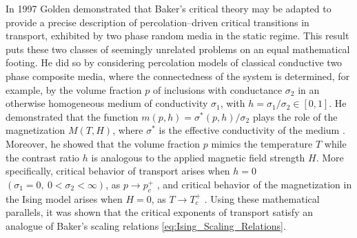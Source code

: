 \documentclass[english,12pt,jmp,graphicx]{revtex4-1}
\begin{document}
In 1997 Golden \cite{Golden:PRL-3935} demonstrated that Baker's
critical theory may be adapted to provide a precise description of
percolation--driven critical transitions in transport, exhibited by
two phase random media in the static regime. This result puts these
two classes of seemingly unrelated problems on an equal mathematical
footing. He did so by considering percolation models of classical
conductive two phase composite media, where the connectedness of the
system is determined, for example, by the volume fraction $p$ of
inclusions with conductance $\sigma_2$ in an otherwise homogeneous medium
of conductivity $\sigma_1$, with $h=\sigma_1/\sigma_2\in[0,1]$. 
He demonstrated that the function $m(p,h)=\sigma^*(p,h)/\sigma_2$ plays the role
of the magnetization  $M(T,H)$, where $\sigma^*$ is the effective
conductivity of the medium
\cite{Bergman:PRC-377,Milton:APL-300,Golden:CMP-473}. Moreover, he 
showed that the volume fraction $p$ mimics the temperature $T$ while
the contrast ratio $h$ is analogous to the applied magnetic field strength $H$. 
More specifically, critical behavior of transport
arises when $h=0$ $(\sigma_1=0, \ 0<\sigma_2<\infty)$, as $p\to p_c^+$
\cite{Golden:PRL-3935}, and 
critical behavior of the magnetization in the Ising model 
arises when $H=0$, as $T\to T_c^+$
\cite{Christensen-2005}. Using these mathematical
parallels, it was shown that the critical exponents of transport 
satisfy an analogue of Baker's %
scaling relations \eqref{eq:Ising_Scaling_Relations}.
\end{document}
